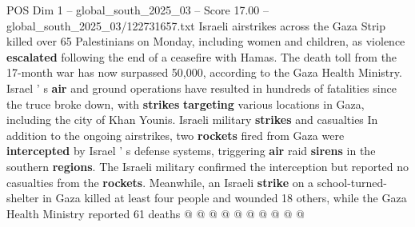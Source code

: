 \begin{textsample}{POS Dim 1 – global\_south\_2025\_03 – Score 17.00 – global\_south\_2025\_03/122731657.txt}
Israeli airstrikes across the Gaza Strip killed over 65 Palestinians on Monday, including women and children, as violence \textbf{escalated} following the end of a ceasefire with Hamas.
The death toll from the 17-month war has now surpassed 50,000, according to the Gaza Health Ministry.
Israel ' s \textbf{air} and ground operations have resulted in hundreds of fatalities since the truce broke down, with \textbf{strikes} \textbf{targeting} various locations in Gaza, including the city of Khan Younis.
Israeli military \textbf{strikes} and casualties In addition to the ongoing airstrikes, two \textbf{rockets} fired from Gaza were \textbf{intercepted} by Israel ' s defense systems, triggering \textbf{air} raid \textbf{sirens} in the southern \textbf{regions}.
The Israeli military confirmed the interception but reported no casualties from the \textbf{rockets}.
Meanwhile, an Israeli \textbf{strike} on a school-turned-shelter in Gaza killed at least four people and wounded 18 others, while the Gaza Health Ministry reported 61 deaths @ @ @ @ @ @ @ @ @ @

\end{textsample}
